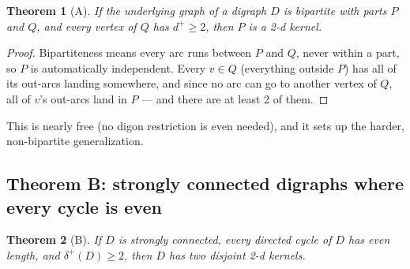 \documentclass[11pt]{article}
\theoremstyle{plain}
\newtheorem{theorem}{Theorem}[section]
\theoremstyle{definition}
\theoremstyle{remark}
\begin{document}
\begin{theorem}[A]
\label{thm:A}
If the underlying graph of a digraph $D$ is bipartite with parts $P$ and $Q$, and
every vertex of $Q$ has $d^+ \ge 2$, then $P$ is a 2-d kernel.
\end{theorem}

\begin{proof}
Bipartiteness means every arc runs between $P$ and $Q$, never within a part, so $P$ is
automatically independent. Every $v \in Q$ (everything outside $P$) has all of its
out-arcs landing somewhere, and since no arc can go to another vertex of $Q$, all of
$v$'s out-arcs land in $P$ — and there are at least 2 of them.
\end{proof}

This is nearly free (no digon restriction is even needed), and it sets up the harder,
non-bipartite generalization.

\subsection{Theorem B: strongly connected digraphs where every cycle is even}

\begin{theorem}[B]
\label{thm:B}
If $D$ is strongly connected, every directed cycle of $D$ has even length, and
$\delta^+(D) \ge 2$, then $D$ has two disjoint 2-d kernels.
\end{theorem}
\end{document}
